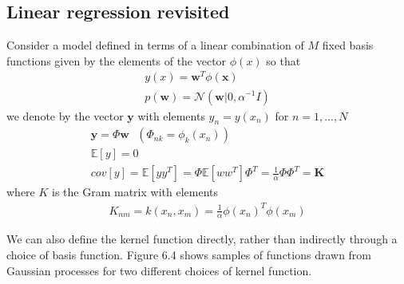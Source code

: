 \documentclass[a4paper]{article}
\begin{document}
\subsection{Linear regression revisited}
Consider a model deﬁned in terms of a linear combination of $M$ ﬁxed
basis functions given by the elements of the vector $\phi(x)$ so that
\begin{align}
y(x) = \mathbf{w}^T\phi(\mathbf{x})\\
p(\mathbf{w}) = \mathcal{N} (\mathbf{w}|0, \alpha^{-1}\mathit{I})
\end{align}
we denote by the vector $\mathbf{y}$ with elements $y_n = y(x_n)$ for $n = 1,...,N$
\begin{align}
\mathbf{y} = \Phi \mathbf{w} \text{ $(\Phi_{nk} = \phi_k(x_n)) $ }\\
\mathbb{E}[y] = 0\\
cov[y] = \mathbb{E}[yy^T] = \Phi \mathbb{E}[ww^T] \Phi^T=
  \frac{1}{\alpha}\Phi\Phi^T = \mathbf{K}
\end{align}
where $K$ is the Gram matrix with elements
\begin{align}
\mathit{K}_{nm} = k(x_n, x_m) = \frac{1}{\alpha} \phi(x_n)^T\phi(x_m)
\end{align}

We can also deﬁne the kernel function directly, rather than indirectly
through a choice of basis function. Figure 6.4 shows samples of functions drawn from Gaussian processes for two different choices of kernel function.
\end{document}
